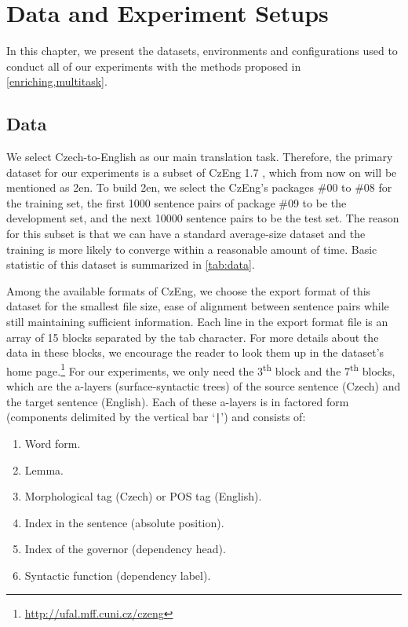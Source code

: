 \chapter{Data and Experiment Setups}
\label{dataexp}

In this chapter, we present the datasets, environments and configurations used to conduct all of our experiments with the methods proposed in \cref{enriching,multitask}.

\section{Data}
\label{dataexp-data}

We select Czech-to-English as our main translation task.
Therefore, the primary dataset for our experiments is a subset of CzEng 1.7 , which from now on will be mentioned as \cs2en.
To build \cs2en, we select the CzEng's packages \#00 to \#08 for the training set, the first 1000 sentence pairs of package \#09 to be the development set, and the next 10000 sentence pairs to be the test set.
The reason for this subset is that we can have a standard average-size dataset and the training is more likely to converge within a reasonable amount of time. 
Basic statistic of this dataset is summarized in \cref{tab:data}.

Among the available formats of CzEng, we choose the export format of this dataset for the smallest file size, ease of alignment between sentence pairs while still maintaining sufficient information.
Each line in the export format file is an array of 15 blocks separated by the tab character.
For more details about the data in these blocks, we encourage the reader to look them up in the dataset's home page.\footnote{\url{http://ufal.mff.cuni.cz/czeng}} 
For our experiments, we only need the 3\textsuperscript{th} block and the 7\textsuperscript{th} blocks, which are the a-layers (surface-syntactic trees) of the source sentence (Czech) and the target sentence (English).
Each of these a-layers is in factored form (components delimited by the vertical bar `\texttt{|}') and consists of:

\begin{enumerate}
    \item Word form.
    \item Lemma.
    \item Morphological tag (Czech) or POS tag (English).
    \item Index in the sentence (absolute position).
    \item Index of the governor (dependency head).
    \item Syntactic function (dependency label).
\end{enumerate}

